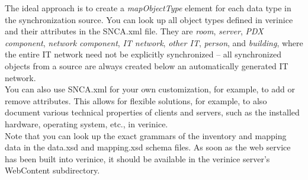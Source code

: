 \documentclass[a4paper,10pt]{book}
\begin{document}
The ideal approach is to create a \textit{mapObjectType} element for each data type in the synchronization
source. You can look up all object types defined in verinice and their attributes in the SNCA.xml file. They are
\textit{room}, \textit{server}, \textit{PDX component}, \textit{network component}, \textit{IT network}, \textit{other IT}, \textit{person},
and \textit{building}, where the entire IT network need not be explicitly synchronized – all synchronized objects from a
source are always created below an automatically generated IT network.
\newline\\
You can also use SNCA.xml for your own customization, for example, to add or remove attributes. This allows for
flexible solutions, for example, to also document various technical properties of clients and servers, such as
the installed hardware, operating system, etc., in verinice.
\newline\\
Note that you can look up the exact grammars of the inventory and mapping data in the data.xsd and mapping.xsd schema
files. As soon as the web service has been built into verinice, it should be available in the verinice server's
WebContent subdirectory.
\end{document}
